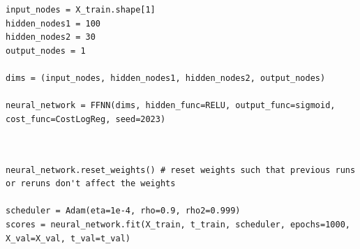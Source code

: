 \documentclass{beamer}
\begin{document}
\begin{frame}
\begin{verbatim}
input_nodes = X_train.shape[1]
hidden_nodes1 = 100
hidden_nodes2 = 30
output_nodes = 1

dims = (input_nodes, hidden_nodes1, hidden_nodes2, output_nodes)

neural_network = FFNN(dims, hidden_func=RELU, output_func=sigmoid, cost_func=CostLogReg, seed=2023)



\end{verbatim}








\begin{verbatim}
neural_network.reset_weights() # reset weights such that previous runs or reruns don't affect the weights

scheduler = Adam(eta=1e-4, rho=0.9, rho2=0.999)
scores = neural_network.fit(X_train, t_train, scheduler, epochs=1000, X_val=X_val, t_val=t_val)


\end{verbatim}
\end{frame}
\end{document}
